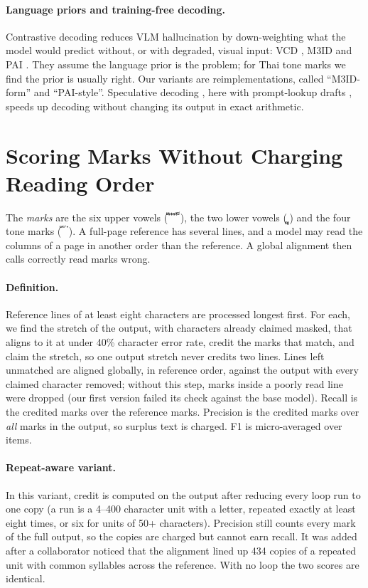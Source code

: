 \documentclass[10pt,twocolumn]{article}
\newcommand{\thai}[1]{{\thaifont #1}}
\begin{document}
\paragraph{Language priors and training-free decoding.} Contrastive decoding reduces VLM hallucination by down-weighting what the model would predict without, or with degraded, visual input: VCD \citep{leng2024vcd}, M3ID \citep{favero2024m3id} and PAI \citep{liu2024pai}. They assume the language prior is the problem; for Thai tone marks we find the prior is usually right. Our variants are reimplementations, called ``M3ID-form'' and ``PAI-style''. Speculative decoding \citep{leviathan2023speculative}, here with prompt-lookup drafts \citep{saxena2023pld}, speeds up decoding without changing its output in exact arithmetic.

\section{Scoring Marks Without Charging Reading Order}\label{sec:metric}
The \emph{marks} are the six upper vowels (\thai{ั ิ ี ึ ื ็}), the two lower vowels (\thai{ุ ู}) and the four tone marks (\thai{่ ้ ๊ ๋}). A full-page reference has several lines, and a model may read the columns of a page in another order than the reference. A global alignment then calls correctly read marks wrong.

\paragraph{Definition.} Reference lines of at least eight characters are processed longest first. For each, we find the stretch of the output, with characters already claimed masked, that aligns to it at under 40\% character error rate, credit the marks that match, and claim the stretch, so one output stretch never credits two lines. Lines left unmatched are aligned globally, in reference order, against the output with every claimed character removed; without this step, marks inside a poorly read line were dropped (our first version failed its check against the base model). Recall is the credited marks over the reference marks. Precision is the credited marks over \emph{all} marks in the output, so surplus text is charged. F1 is micro-averaged over items.

\paragraph{Repeat-aware variant.} In this variant, credit is computed on the output after reducing every loop run to one copy (a run is a 4--400 character unit with a letter, repeated exactly at least eight times, or six for units of 50+ characters). Precision still counts every mark of the full output, so the copies are charged but cannot earn recall. It was added after a collaborator noticed that the alignment lined up 434 copies of a repeated unit with common syllables across the reference. With no loop the two scores are identical.
\end{document}
